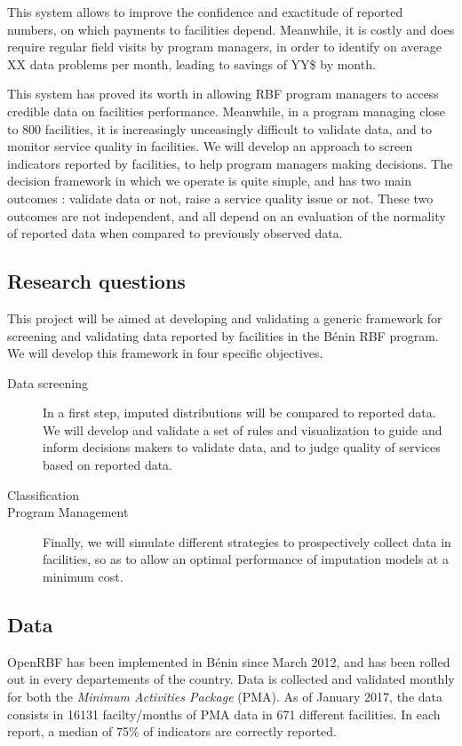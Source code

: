 This system allows to improve the confidence and exactitude of reported numbers, on which payments to facilities depend. Meanwhile, it is costly and does require regular field visits by program managers, in order to identify on average XX data problems per month, leading to savings of YY\$ by month.

This system has proved its worth in allowing RBF program managers to access credible data on facilities performance. Meanwhile, in a program managing close to 800 facilities, it is increasingly unceasingly difficult to validate data, and to monitor service quality in facilities. We will develop an approach to screen indicators reported by facilities, to help program managers making decisions. The decision framework in which we operate is quite simple, and has two main outcomes : validate data or not, raise a service quality issue or not. These two outcomes are not independent, and all depend on an evaluation of the normality of reported data when compared to previously observed data.

\subsection{Research questions}

This project will be aimed at developing and validating a generic framework for screening and validating data reported by facilities in the Bénin RBF program. We will develop this framework in four specific objectives.

\begin{description}
	\item[Data screening] In a first step, imputed distributions will be compared to reported data. We will develop and validate a set of rules and visualization to guide and inform decisions makers to validate data, and to judge quality of services based on reported data.
	\item[Classification]
	\item[Program Management] Finally, we will simulate different strategies to prospectively collect data in facilities, so as to allow an optimal performance of imputation models at a minimum cost.
\end{description}

\subsection{Data}
\label{paper2_data}

OpenRBF has been implemented in Bénin since March 2012, and has been rolled out in every departements of the country. Data is collected and validated monthly for both the \textit{Minimum Activities Package} (PMA). As of January 2017, the data consists in 16131 facilty/months of PMA data in 671 different facilities. In each report, a median of 75\% of indicators are correctly reported.

